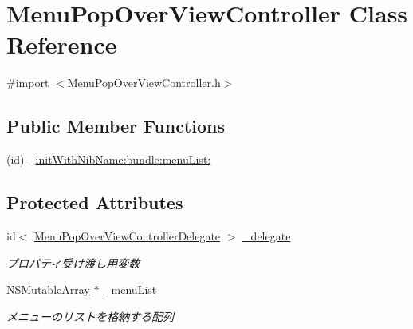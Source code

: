 \hypertarget{interface_menu_pop_over_view_controller}{
\section{MenuPopOverViewController Class Reference}
\label{interface_menu_pop_over_view_controller}
}


{\ttfamily \#import $<$MenuPopOverViewController.h$>$}

\subsection*{Public Member Functions}
\begin{DoxyCompactItemize}
\item 
(id) -\/ \hyperlink{interface_menu_pop_over_view_controller_a24370b6d95ae51f762a471789e75bd57}{initWithNibName:bundle:menuList:}
\end{DoxyCompactItemize}
\subsection*{Protected Attributes}
\begin{DoxyCompactItemize}
\item 
\hypertarget{interface_menu_pop_over_view_controller_adef8413e314705078ba57518c01a8023}{
id$<$ \hyperlink{protocol_menu_pop_over_view_controller_delegate-p}{MenuPopOverViewControllerDelegate} $>$ \hyperlink{interface_menu_pop_over_view_controller_adef8413e314705078ba57518c01a8023}{\_\-delegate}}
\label{interface_menu_pop_over_view_controller_adef8413e314705078ba57518c01a8023}

\begin{DoxyCompactList}\small\item\em プロパティ受け渡し用変数 \end{DoxyCompactList}\item 
\hypertarget{interface_menu_pop_over_view_controller_aa3fd8d3e76a2dd48cc18b148ecc7adb5}{
\hyperlink{class_n_s_mutable_array}{NSMutableArray} $\ast$ \hyperlink{interface_menu_pop_over_view_controller_aa3fd8d3e76a2dd48cc18b148ecc7adb5}{\_\-menuList}}
\label{interface_menu_pop_over_view_controller_aa3fd8d3e76a2dd48cc18b148ecc7adb5}

\begin{DoxyCompactList}\small\item\em メニューのリストを格納する配列 \end{DoxyCompactList}\end{DoxyCompactItemize}
